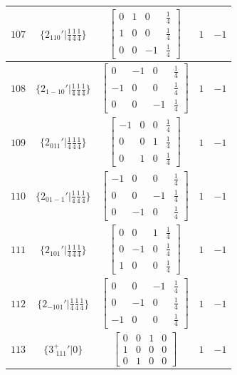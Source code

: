 \documentclass[fleqn,8pt]{jsarticle}
\begin{document}
\begin{longtable}{ccccc}
$ 107 $ & $ \{2{}_{110}{}'|\frac{1}{4} \frac{1}{4} \frac{1}{4}\} $ & $ \begin{bmatrix} 0 & 1 & 0 & \frac{1}{4} \\ 1 & 0 & 0 & \frac{1}{4} \\ 0 & 0 & -1 & \frac{1}{4} \end{bmatrix} $ & $ 1 $ & $ -1 $ \\ \hline
$ 108 $ & $ \{2{}_{1-10}{}'|\frac{1}{4} \frac{1}{4} \frac{1}{4}\} $ & $ \begin{bmatrix} 0 & -1 & 0 & \frac{1}{4} \\ -1 & 0 & 0 & \frac{1}{4} \\ 0 & 0 & -1 & \frac{1}{4} \end{bmatrix} $ & $ 1 $ & $ -1 $ \\ \hline
$ 109 $ & $ \{2{}_{011}{}'|\frac{1}{4} \frac{1}{4} \frac{1}{4}\} $ & $ \begin{bmatrix} -1 & 0 & 0 & \frac{1}{4} \\ 0 & 0 & 1 & \frac{1}{4} \\ 0 & 1 & 0 & \frac{1}{4} \end{bmatrix} $ & $ 1 $ & $ -1 $ \\ \hline
$ 110 $ & $ \{2{}_{01-1}{}'|\frac{1}{4} \frac{1}{4} \frac{1}{4}\} $ & $ \begin{bmatrix} -1 & 0 & 0 & \frac{1}{4} \\ 0 & 0 & -1 & \frac{1}{4} \\ 0 & -1 & 0 & \frac{1}{4} \end{bmatrix} $ & $ 1 $ & $ -1 $ \\ \hline
$ 111 $ & $ \{2{}_{101}{}'|\frac{1}{4} \frac{1}{4} \frac{1}{4}\} $ & $ \begin{bmatrix} 0 & 0 & 1 & \frac{1}{4} \\ 0 & -1 & 0 & \frac{1}{4} \\ 1 & 0 & 0 & \frac{1}{4} \end{bmatrix} $ & $ 1 $ & $ -1 $ \\ \hline
$ 112 $ & $ \{2{}_{-101}{}'|\frac{1}{4} \frac{1}{4} \frac{1}{4}\} $ & $ \begin{bmatrix} 0 & 0 & -1 & \frac{1}{4} \\ 0 & -1 & 0 & \frac{1}{4} \\ -1 & 0 & 0 & \frac{1}{4} \end{bmatrix} $ & $ 1 $ & $ -1 $ \\ \hline
$ 113 $ & $ \{3^{+}_{\,\,111}{}'|0\} $ & $ \begin{bmatrix} 0 & 0 & 1 & 0 \\ 1 & 0 & 0 & 0 \\ 0 & 1 & 0 & 0 \end{bmatrix} $ & $ 1 $ & $ -1 $ \\ \hline

\end{longtable}
\end{document}
